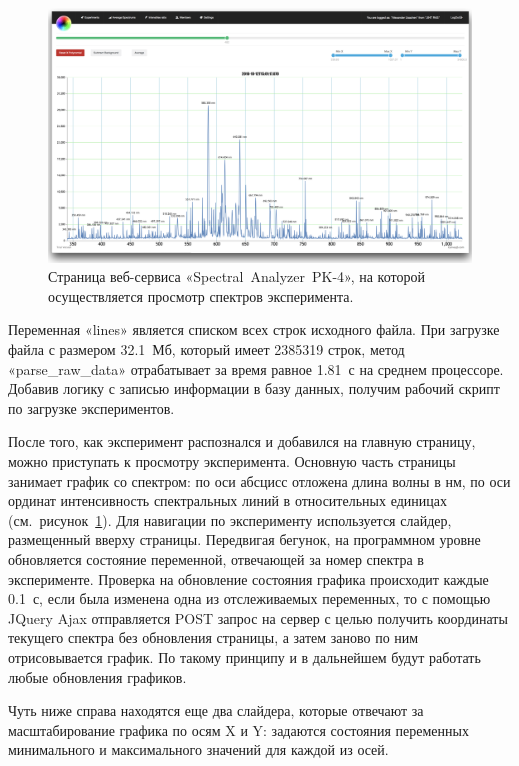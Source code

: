 \begin{figure}[t]
  \centering
  \includegraphics[width=16cm]{figures/experiment}
  \caption{Страница веб-сервиса «Spectral~Analyzer~PK-4», на которой осуществляется просмотр спектров эксперимента.}
  \label{fig:experiment}
\end{figure}
Переменная «lines» является списком всех строк исходного файла. При загрузке файла с размером 32.1~Мб, который имеет
2385319 строк, метод «parse\_raw\_data» отрабатывает за время равное 1.81~с на среднем процессоре. Добавив логику с записью
информации в базу данных, получим рабочий скрипт по загрузке экспериментов.

После того, как эксперимент распознался и добавился на главную страницу, можно приступать к просмотру эксперимента.
Основную часть страницы занимает график со спектром: по оси абсцисс отложена длина волны в нм, по оси ординат интенсивность
спектральных линий в относительных единицах (см.~рисунок~\ref{fig:experiment}). Для навигации по эксперименту используется слайдер,
размещенный вверху страницы. Передвигая бегунок, на программном уровне обновляется состояние переменной, отвечающей за номер спектра в эксперименте.
Проверка на обновление состояния графика происходит каждые 0.1~с, если была изменена одна из отслеживаемых переменных, то
с помощью JQuery Ajax отправляется POST запрос на сервер с целью получить координаты текущего спектра без обновления
страницы, а затем заново по ним отрисовывается график. По такому принципу и в дальнейшем будут работать любые обновления
графиков.

Чуть ниже справа находятся еще два слайдера, которые отвечают за масштабирование графика по осям X и Y: задаются
состояния переменных минимального и максимального значений для каждой из осей.


